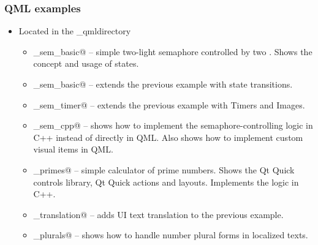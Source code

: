  \begin{frame}[fragile]
  \frametitle{QML examples}
  \small
  \begin{itemize}
    \item Located in the \verb@examples{}_qml\@ directory
    \begin{itemize}
      \item {}_sem_basic@ -- simple two-light semaphore controlled by two
        . Shows the concept and usage of states.
      \item {}_sem_basic@ -- extends the previous example with state
        transitions.
      \item {}_sem_timer@ -- extends the previous example with Timers and
        Images.
      \item {}_sem_cpp@ -- shows how to implement the semaphore-controlling
        logic in C++ instead of directly in QML. Also shows how to implement
        custom visual items in QML.
      \item {}_primes@ -- simple calculator of prime numbers. Shows the
        Qt Quick controls library, Qt Quick actions and layouts. Implements
        the logic in C++.
      \item {}_translation@ -- adds UI text translation to the previous
        example.
      \item {}_plurals@ -- shows how to handle number plural forms in
        localized texts.
    \end{itemize}
  \end{itemize}
\end{frame}

